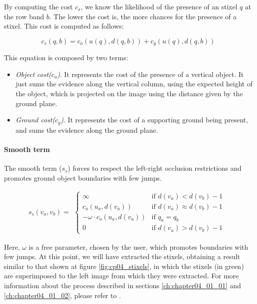 By computing the cost $c_s$, we know the likelihood of the presence of an stixel $q$ at the row band $b$. The lower the cost is, the more chances for the presence of a stixel. This cost is computed as follows:

\begin{equation}\label{eq:cp04_stixel_band_cost_data_term}
  c_s(q, b) = c_o (u(q), d(q, b)) + c_g(u(q), d(q,b))
\end{equation}

This equation is composed by two terms:
\begin{itemize}
 \item \emph{Object cost($c_o$)}. It represents the cost of the presence of a vertical object. It just sums the evidence along the vertical column, using the expected height of the object, which is projected on the image using the distance given by the ground plane.
 \item \emph{Ground cost($c_g$)}. It represents the cost of a supporting ground being present, and sums the evidence along the ground plane.
\end{itemize}

\paragraph{Smooth term}\label{ch:chapter04_01_02_02}

The smooth term ($s_s$) forces to respect the left-right occlusion restrictions and promotes ground object boundaries with few jumps.

\begin{equation}\label{eq:cp04_stixel_band_cost_smooth_term}
  s_s(v_a, v_b) = 
  \begin{align*}
    \begin{cases}
    \infty & \text{if } d(v_a) < d(v_b) - 1 \\
    c_o(u_a, d(v_a)) & \text{if } d(v_a) \approx d(v_b) - 1 \\
    - \omega \cdot c_o(u_a, d(v_a)) & \text{if } q_a = q_b \\
    0 & \text{if } d(v_a) > d(v_b) - 1
    \end{cases}
  \end{align*}
\end{equation}

Here, $\omega$ is a free parameter, chosen by the user, which promotes boundaries with few jumps. At this point, we will have extracted the stixels, obtaining a result similar to that shown at figure \ref{fig:cp04_stixels}, in which the stixels (in green) are superimposed to the left image from which they were extracted. For more information about the process described in sections \ref{ch:chapter04_01_01} and \ref{ch:chapter04_01_02}, please refer to \cite{benenson2012pedestrian}.


